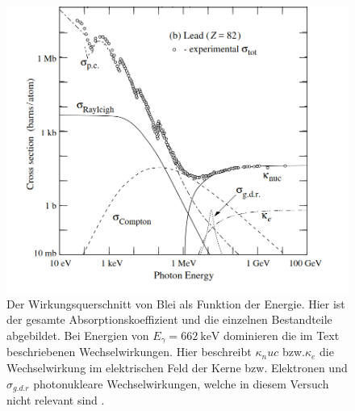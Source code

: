 \begin{figure}
    \centering
    \includegraphics[width = \linewidth]{content/Absorb.png}
    \caption{Der Wirkungsquerschnitt von Blei als Funktion der Energie. Hier ist der gesamte Absorptionskoeffizient und die einzelnen Bestandteile abgebildet. Bei Energien von $E_{\gamma} = \SI{662}{\keV}$ dominieren die im Text beschriebenen Wechselwirkungen. Hier beschreibt $\kappa_nuc$ bzw.$ \kappa_{e}$ die Wechselwirkung im elektrischen Feld der Kerne bzw. Elektronen und $\sigma_{g.d.r}$ photonukleare Wechselwirkungen, welche in diesem Versuch nicht relevant sind \cite{pdg}.}
    \label{fig:sigma}
\end{figure}
